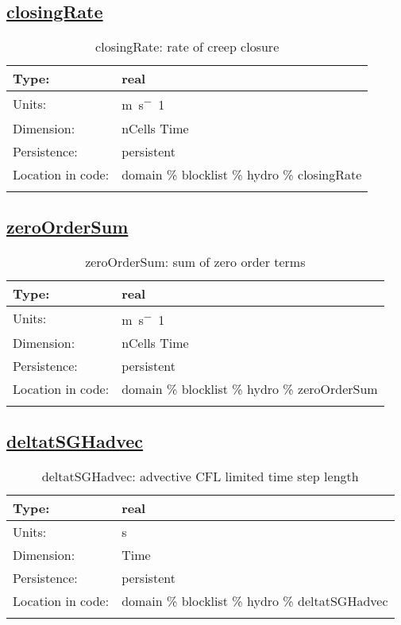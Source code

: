 \subsection[closingRate]{\hyperref[sec:var_tab_hydro]{closingRate}}
\label{subsec:var_sec_hydro_closingRate}
\begin{center}
\begin{longtable}{| p{2.0in} | p{4.0in} |}
        \hline 
        Type: & real \\
        \hline 
        Units: & \si{m.s^-1} \\
        \hline 
        Dimension: & nCells Time \\
        \hline 
        Persistence: & persistent \\
        \hline 
         Location in code: & domain \% blocklist \% hydro \% closingRate \\
         \hline 
    \caption{closingRate: rate of creep closure}
\end{longtable}
\end{center}
\subsection[zeroOrderSum]{\hyperref[sec:var_tab_hydro]{zeroOrderSum}}
\label{subsec:var_sec_hydro_zeroOrderSum}
\begin{center}
\begin{longtable}{| p{2.0in} | p{4.0in} |}
        \hline 
        Type: & real \\
        \hline 
        Units: & \si{m.s^-1} \\
        \hline 
        Dimension: & nCells Time \\
        \hline 
        Persistence: & persistent \\
        \hline 
         Location in code: & domain \% blocklist \% hydro \% zeroOrderSum \\
         \hline 
    \caption{zeroOrderSum: sum of zero order terms}
\end{longtable}
\end{center}
\subsection[deltatSGHadvec]{\hyperref[sec:var_tab_hydro]{deltatSGHadvec}}
\label{subsec:var_sec_hydro_deltatSGHadvec}
\begin{center}
\begin{longtable}{| p{2.0in} | p{4.0in} |}
        \hline 
        Type: & real \\
        \hline 
        Units: & \si{s} \\
        \hline 
        Dimension: & Time \\
        \hline 
        Persistence: & persistent \\
        \hline 
         Location in code: & domain \% blocklist \% hydro \% deltatSGHadvec \\
         \hline 
    \caption{deltatSGHadvec: advective CFL limited time step length}
\end{longtable}
\end{center}
